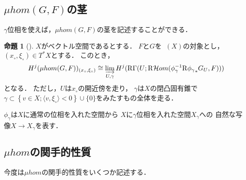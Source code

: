 \documentclass[leqno, 10pt, a4paper, dvipdfmx]{jsarticle}
\theoremstyle{definition}
\numberwithin{equation}{section}
\newcommand{\Dompb}{\mathop{\mathsf{D}^\mathrm{b}}\nolimits}
\newcommand{\HOM}{\mathop{\mathcal{H}\hspace{-0pt}om}\nolimits}%
\newcommand{\RHOM}{\mathop{\mathrm{R}\hspace{-1.5pt}\HOM}\nolimits}
\newcommand{\RG}{\mathop{\mathrm{R}\hspace{-0pt}\Gamma}\nolimits}
\newcommand{\Rder}{\mathrm{R}}
\newcommand{\indlim}[1][]{\mathop{\varinjlim}\limits_{#1}}
\theoremstyle{mystyle}
\newtheorem{PRP}[AXM]{命題}
\renewenvironment{leftbar}{%
  \def\FrameCommand{\textcolor{lightgray}{\vrule width 4pt} \hspace{10pt}}%
  \MakeFramed {\advance\hsize-\width \FrameRestore}}%
{\endMakeFramed}
\def\inner<#1>{\langle #1 \rangle}
\newcommand{\cotb}[1][]{T^{\ast}{#1}}
\newcommand{\muhom}{\mu hom}
\begin{document}
\subsection*{ \(\muhom(G,F)\)の茎}

\(\gamma\)位相を使えば，\(\muhom(G,F)\)の茎を記述することができる．

\begin{leftbar}
\begin{PRP}[{\cite[Prop.4.4.4]{KS90}}]\label{prp4.4.4}
  \(X\)がベクトル空間であるとする．
  \(F\)と\(G\)を\(\Dompb(X)\)の対象とし，\((x_{\circ},\xi_{\circ})\in\cotb[X]\)とする．
  このとき，
  \[
    H^{j}(\muhom(G,F))_{(x_{\circ},\xi_{\circ})}
    \cong
    \indlim[U,\gamma]H^{j}(\RG(U;\RHOM(\phi_{\gamma}^{-1}\Rder{{\phi_{\gamma}}_{\ast}}G_{U},F)))
  \]
  となる．
  ただし，\(U\)は\(x_{\circ}\)の開近傍を走り，
  \(\gamma\)は\(X\)の閉凸固有錐で\(
    \gamma\subset\left\{
      v\in X;\inner<v,\xi_{\circ}><0
    \right\}\cup\{0\}
  \)をみたすもの全体を走る．
\end{PRP}
\end{leftbar}

\(\phi_{\gamma}\)は\(X\)に通常の位相を入れた空間から
\(X\)に\(\gamma\)位相を入れた空間\(X_{\gamma}\)への
自然な写像\(X\to X_{\gamma}\)を表す．

\subsection*{ \(\muhom\)の関手的性質}

今度は\(\muhom\)の関手的性質をいくつか記述する．
\end{document}
